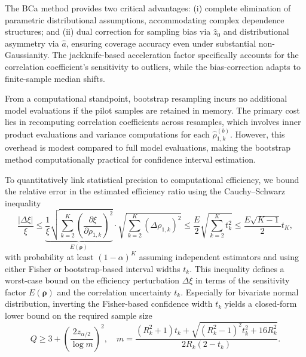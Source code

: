 %
The BCa method provides two critical advantages: (i) complete elimination of parametric distributional assumptions, accommodating complex dependence structures; and (ii) dual correction for sampling bias via $\widehat{z}_0$ and distributional asymmetry via $\widehat{a}$, ensuring coverage accuracy even under substantial non-Gaussianity. The jackknife-based acceleration factor specifically accounts for the correlation coefficient's sensitivity to outliers, while the bias-correction adapts to finite-sample median shifts.


From a computational standpoint, bootstrap resampling incurs no additional model evaluations if the pilot samples are retained in memory. The primary cost lies in recomputing correlation coefficients across resamples, which involves inner product evaluations and variance computations for each $\widehat{\rho}_{1,k}^{(b)}$. However, this overhead is modest compared to full model evaluations, making the bootstrap method computationally practical for confidence interval estimation.

To quantitatively link statistical precision to computational efficiency, we bound the relative error in the estimated efficiency ratio using the Cauchy–Schwarz inequality
%
\begin{equation}\label{eq:delta_xi_bound}
    \frac{\left|\Delta \xi\right|}{\xi}\le \underbrace{\frac{1}{\xi}\sqrt{\sum_{k=2}^K \left(\frac{\partial \xi}{\partial \rho_{1,k}}\right)^2}}_{E(\boldsymbol{\rho})} \cdot \sqrt{\sum_{k=2}^K\left(\Delta\rho_{1,k}\right)^2}
    \le \frac{E}{2} \sqrt{\sum_{k=2}^K t_k^2}\le \frac{E\sqrt{K-1}}{2}t_K,
\end{equation}
%
with probability at least $(1 - \alpha)^K$ assuming independent estimators and using either Fisher or bootstrap-based interval widths $t_k$. This inequality defines a worst-case bound on the efficiency perturbation $\Delta \xi$ in terms of the sensitivity factor $E(\boldsymbol{\rho})$ and the correlation uncertainty $t_k$. 
Especially for bivariate normal distribution, inverting the Fisher-based confidence width $t_k$ yields a closed-form lower bound on the required sample size
%
\begin{equation*}\label{eq:Pilot_sample_size_estimate}
Q \geq 3 + \left( \frac{2 z_{\alpha/2}}{\log m} \right)^2, \quad m = \frac{(R_k^2 + 1)t_k + \sqrt{(R_k^2 - 1)^2 t_k^2 + 16 R_k^2}}{2 R_k (2 - t_k)}.
\end{equation*}
%



